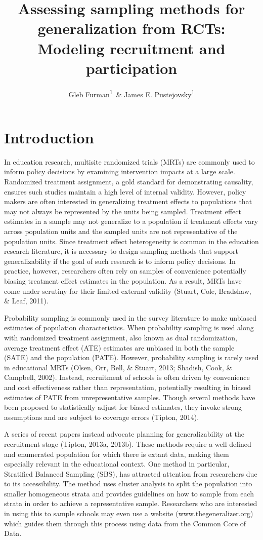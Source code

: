 \documentclass[man,floatsintext]{apa6}
\title{Assessing sampling methods for generalization from RCTs: Modeling recruitment and participation}
\author{Gleb Furman\textsuperscript{1}~\& James E. Pustejovsky\textsuperscript{1}}
\date{}
\affiliation{
\vspace{0.5cm}
\textsuperscript{1} University of Texas at Austin}
\begin{document}
\maketitle

\hypertarget{introduction}{%
\section{Introduction}\label{introduction}}

In education research, multisite randomized trials (MRTs) are commonly used to inform policy decisions by examining intervention impacts at a large scale. Randomized treatment assignment, a gold standard for demonstrating causality, ensures such studies maintain a high level of internal validity. However, policy makers are often interested in generalizing treatment effects to populations that may not always be represented by the units being sampled. Treatment effect estimates in a sample may not generalize to a population if treatment effects vary across population units and the sampled units are not representative of the population units. Since treatment effect heterogeneity is common in the education research literature, it is necessary to design sampling methods that support generalizability if the goal of such research is to inform policy decisions. In practice, however, researchers often rely on samples of convenience potentially biasing treatment effect estimates in the population. As a result, MRTs have come under scrutiny for their limited external validity (Stuart, Cole, Bradshaw, \& Leaf, 2011).

Probability sampling is commonly used in the survey literature to make unbiased estimates of population characteristics. When probability sampling is used along with randomized treatment assignment, also known as dual randomization, average treatment effect (ATE) estimates are unbiased in both the sample (SATE) and the population (PATE). However, probability sampling is rarely used in educational MRTs (Olsen, Orr, Bell, \& Stuart, 2013; Shadish, Cook, \& Campbell, 2002). Instead, recruitment of schools is often driven by convenience and cost effectiveness rather than representation, potentially resulting in biased estimates of PATE from unrepresentative samples. Though several methods have been proposed to statistically adjust for biased estimates, they invoke strong assumptions and are subject to coverage errors (Tipton, 2014).

A series of recent papers instead advocate planning for generalizability at the recruitment stage (Tipton, 2013a, 2013b). These methods require a well defined and enumerated population for which there is extant data, making them especially relevant in the educational context. One method in particular, Stratified Balanced Sampling (SBS), has attracted attention from researchers due to its accessibility. The method uses cluster analysis to split the population into smaller homogeneous strata and provides guidelines on how to sample from each strata in order to achieve a representative sample. Researchers who are interested in using this to sample schools may even use a website (www.thegeneralizer.org) which guides them through this process using data from the Common Core of Data.
\end{document}
